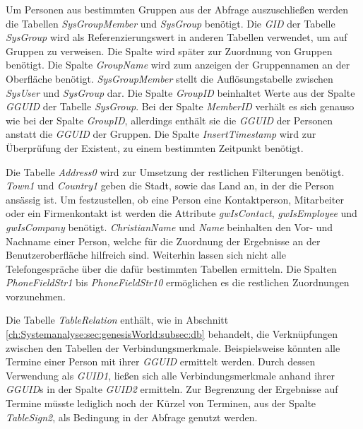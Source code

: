Um Personen aus bestimmten Gruppen aus der Abfrage auszuschließen werden die Tabellen \textit{SysGroupMember} und \textit{SysGroup} benötigt. Die \textit{GID} der Tabelle \textit{SysGroup} wird als Referenzierungswert in anderen Tabellen verwendet, um auf Gruppen zu verweisen. Die Spalte wird später zur Zuordnung von Gruppen benötigt. Die Spalte \textit{GroupName} wird zum anzeigen der Gruppennamen an der Oberfläche benötigt.  \textit{SysGroupMember} stellt die Auflösungstabelle zwischen \textit{SysUser} und \textit{SysGroup} dar. Die Spalte \textit{GroupID} beinhaltet Werte aus der Spalte \textit{GGUID} der Tabelle \textit{SysGroup}. Bei der Spalte \textit{MemberID} verhält es sich genauso wie bei der Spalte \textit{GroupID}, allerdings enthält sie die \textit{GGUID} der Personen anstatt die \textit{GGUID} der Gruppen. Die Spalte \textit{InsertTimestamp} wird zur Überprüfung der Existent, zu einem bestimmten Zeitpunkt benötigt.

Die Tabelle \textit{Address0} wird zur Umsetzung der restlichen Filterungen benötigt. \textit{Town1} und \textit{Country1} geben die Stadt, sowie das Land an, in der die Person ansässig ist. Um festzustellen, ob eine Person eine Kontaktperson, Mitarbeiter oder ein Firmenkontakt ist werden die Attribute \textit{gwIsContact}, \textit{gwIsEmployee} und \textit{gwIsCompany} benötigt. \textit{ChristianName} und \textit{Name} beinhalten den Vor- und Nachname einer Person, welche für die Zuordnung der Ergebnisse an der Benutzeroberfläche hilfreich sind. Weiterhin lassen sich  nicht alle Telefongespräche über die dafür bestimmten Tabellen ermitteln. Die Spalten \textit{PhoneFieldStr1} bis \textit{PhoneFieldStr10} ermöglichen es die restlichen Zuordnungen vorzunehmen.

Die Tabelle \textit{TableRelation} enthält, wie in Abschnitt \ref{ch:Systemanalyse:sec:genesisWorld:subsec:db} behandelt, die Verknüpfungen zwischen den Tabellen der Verbindungsmerkmale. Beispielsweise könnten alle Termine einer Person mit ihrer \textit{GGUID} ermittelt werden. Durch dessen Verwendung als \textit{GUID1}, ließen sich alle Verbindungsmerkmale anhand ihrer \textit{GGUID}s in der Spalte \textit{GUID2} ermitteln. Zur Begrenzung der Ergebnisse auf Termine müsste lediglich noch der Kürzel von Terminen, aus der Spalte \textit{TableSign2}, als Bedingung in der Abfrage genutzt werden.

